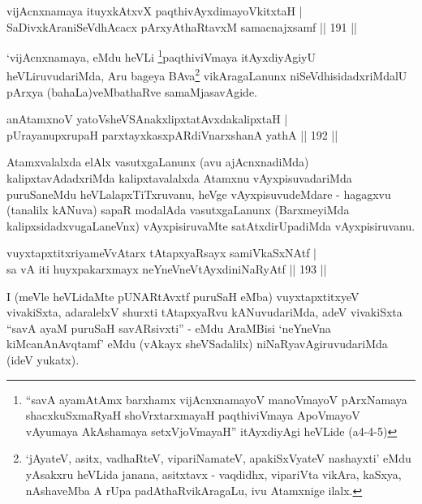 \begin{shl}
vijAcnxnamaya ituyxkAtxvX paqthivAyxdimayoVkitxtaH |\\
SaDivxkAraniSeVdhAcacx pArxyAthaRtavxM samacnajxsamf \hfill || 191 ||
\end{shl}

\begin{artha}
`vijAcnxnamaya, eMdu heVLi \footnote{``savA ayamAtAmx barxhamx vijAcnxnamayoV manoVmayoV pArxNamaya shacxkuSxmaRyaH shoVrxtarxmayaH paqthiviVmaya ApoVmayoV vAyumaya AkAshamaya setxVjoVmayaH'' itAyxdiyAgi heVLide (a4-4-5)}paqthiviVmaya itAyxdiyAgiyU heVLiruvudariMda, Aru bageya BAva\footnote{`jAyateV, asitx, vadhaRteV, vipariNamateV, apakiSxVyateV nashayxti' eMdu yAsakxru heVLida janana, asitxtavx - vaqdidhx, vipariVta vikAra, kaSxya, nAshaveMba A rUpa padAthaRvikAragaLu, ivu Atamxnige ilalx.} vikAragaLanunx niSeVdhisidadxriMdalU pArxya (bahaLa)veMbathaRve samaMjasavAgide.
\end{artha}


\begin{shl}
anAtamxnoV yatoV\s sheVSAnakxlipxtatAvxdakalipxtaH |\\
pUrayanupxrupaH parxtayxkasxpARdiVnarxshanA yathA \hfill || 192 ||
\end{shl}

\begin{artha}
Atamxvalalxda elAlx vasutxgaLanunx (avu ajAcnxnadiMda) kalipxtavAdadxriMda kalipxtavalalxda Atamxnu vAyxpisuvadariMda puruSaneMdu heVLalapxTiTxruvanu, heVge vAyxpisuvudeMdare - hagagxvu (tanalilx kANuva) sapaR modalAda vasutxgaLanunx (BarxmeyiMda kalipxsidadxvugaLaneVnx) vAyxpisiruvaMte satAtxdirUpadiMda vAyxpisiruvanu.
\end{artha}



\begin{shl}
vuyxtapxtitxriyameVvAtarx tAtapxyaRsayx samiVkaSxNAtf |\\
sa vA iti huyxpakarxmayx neYneVneVtAyxdiniNaRyAtf \hfill || 193 ||
\end{shl}

\begin{artha}
I (meVle heVLidaMte pUNARtAvxtf puruSaH eMba) vuyxtapxtitxyeV vivakiSxta, adaralelxV shurxti tAtapxyaRvu kANuvudariMda, adeV vivakiSxta ``savA ayaM puruSaH savARsivxti'' - eMdu AraMBisi `neYneVna kiMcanAnAvqtamf' eMdu (vAkayx sheVSadalilx) niNaRyavAgiruvudariMda (ideV yukatx).
\end{artha}


